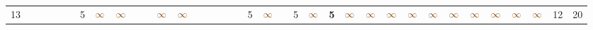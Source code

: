 \begin{landscape}
\begin{table}
\begin{adjustwidth}{-2.6cm}{}
{\begin{tabular}{l|lllllllllllllllllllllllllllllllll|ll}
		13   &            &                                                                 &                                                                 &                                                                 &                                                                 & 5                                                               & $\textcolor[rgb]{0.541,0.29,0.043}{\infty}$ & $\textcolor[rgb]{0.541,0.29,0.043}{\infty}$ &                                                                 &                                                                 & $\textcolor[rgb]{0.541,0.29,0.043}{\infty}$ & $\textcolor[rgb]{0.541,0.29,0.043}{\infty}$ &                                                                 &                                                                 &                                                                 &                                                                 &                                                                 & 5                                                               & $\textcolor[rgb]{0.541,0.29,0.043}{\infty}$ &                                                                 & 5                                                               & $\textcolor[rgb]{0.541,0.29,0.043}{\infty}$ & \textbf{5}                                                      & $\textcolor[rgb]{0.541,0.29,0.043}{\infty}$ & $\textcolor[rgb]{0.541,0.29,0.043}{\infty}$ & $\textcolor[rgb]{0.541,0.29,0.043}{\infty}$ & $\textcolor[rgb]{0.541,0.29,0.043}{\infty}$ & $\textcolor[rgb]{0.541,0.29,0.043}{\infty}$ & $\textcolor[rgb]{0.541,0.29,0.043}{\infty}$ & $\textcolor[rgb]{0.541,0.29,0.043}{\infty}$ & $\textcolor[rgb]{0.541,0.29,0.043}{\infty}$ & $\textcolor[rgb]{0.541,0.29,0.043}{\infty}$ & $\textcolor[rgb]{0.541,0.29,0.043}{\infty}$ & 12         & 20          \\

\end{tabular}}
\end{adjustwidth}
\end{table}
\end{landscape}
